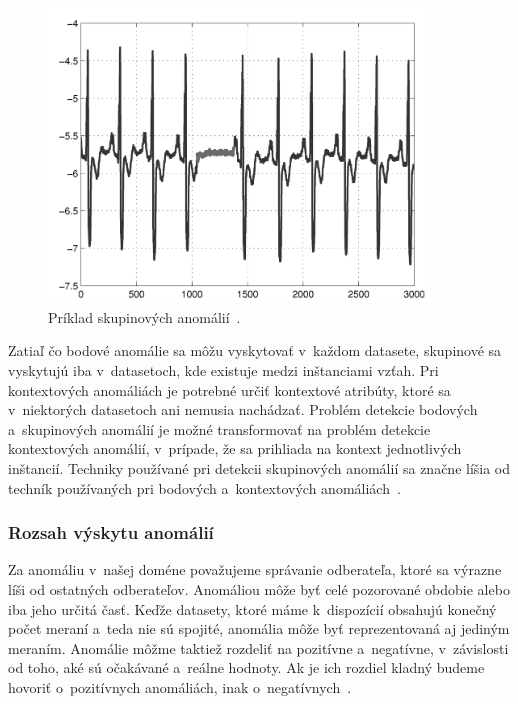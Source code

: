 \documentclass[a4paper,twoside,slovak,12pt,appendix]{article}
\begin{document}
\begin{figure}[H]
  \centering
  \includegraphics[width=0.9\textwidth]{collective_anomalies.png}
  \caption{Príklad skupinových anomálií~\cite{Chandola2009}.}
  \label{fig:collective-anomalies}
\end{figure}

Zatiaľ čo bodové anomálie sa môžu vyskytovať v~každom datasete, skupinové sa
vyskytujú iba v~datasetoch, kde existuje medzi inštanciami vzťah. Pri
kontextových anomáliách je potrebné určiť kontextové atribúty, ktoré sa
v~niektorých datasetoch ani nemusia nachádzať. Problém detekcie bodových
a~skupinových anomálií je možné transformovať na problém detekcie kontextových
anomálií, v~prípade, že sa prihliada na kontext jednotlivých inštancií. Techniky
používané pri detekcii skupinových anomálií sa značne líšia od techník
používaných pri bodových a~kontextových anomáliách~\cite{Chandola2009}.


\subsubsection{Rozsah výskytu anomálií}
Za anomáliu v~našej doméne považujeme správanie odberateľa, ktoré sa výrazne
líši od ostatných odberateľov. Anomáliou môže byť celé pozorované obdobie alebo
iba jeho určitá časť. Keďže datasety, ktoré máme k~dispozícií obsahujú konečný
počet meraní a~teda nie sú spojité, anomália môže byť reprezentovaná aj jediným
meraním. Anomálie môžme taktiež rozdeliť na pozitívne a~negatívne, v~závislosti
od toho, aké sú očakávané a~reálne hodnoty. Ak je ich rozdiel kladný budeme
hovoriť o~pozitívnych anomáliách, inak o~negatívnych~\cite{Kejariwal2015}.
\end{document}
